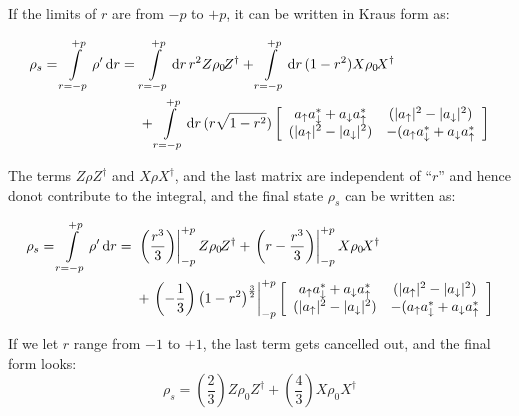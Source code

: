 \documentclass[english]{article}
\DeclarePairedDelimiter\abs{\lvert}{\rvert}
\begin{document}
If the limits of $r$ are from $-p$ to $+p$, it can be written in Kraus form as:

\begin{equation}\label{eq:Krausform-integral}
  \begin{aligned}
    \rho_{s} = \int\limits_{r=-p}^{+p}\rho^{\prime}\,\mathrm{d}r = {} & \int\limits_{r=-p}^{+p}\mathrm{d}r\,r^{2}Z\rho_{0}\!Z^{\dagger} + \int\limits_{r=-p}^{+p}\mathrm{d}r\,(1-r^{2})X\rho_{0}\!X^{\dagger} \\
                  & + \int\limits_{r=-p}^{+p}\mathrm{d}r\,(r\sqrt{1-r^{2}})\left[\begin{array}{cc}a_{\uparrow}a_{\downarrow}^{*}+a_{\downarrow}a_{\uparrow}^{*} & (\abs{a_{\uparrow}}^{2}-\abs{a_{\downarrow}}^{2}) \\
             (\abs{a_{\uparrow}}^{2}-\abs{a_{\downarrow}}^{2}) & -(a_{\uparrow}a_{\downarrow}^{*}+a_{\downarrow}a_{\uparrow}^{*} \end{array}\right]
  \end{aligned}
\end{equation}

The terms $Z\rho\!Z^{\dagger}$ and $X\rho\!X^{\dagger}$, and the last matrix are independent of ``$r$'' and hence donot contribute to the integral, and the final state $\rho_{s}$ can be written as:

\begin{equation}
  \begin{aligned}
    \rho_{s} = \int\limits_{r=-p}^{+p}\rho^{\prime}\,\mathrm{d}r = {} & \left.\left(\dfrac{r^{3}}{3}\right)\right|_{-p}^{+p}Z\rho_{0}\!Z^{\dagger} + \left.\left(r -\dfrac{r^{3}}{3}\right)\right|_{-p}^{+p}X\rho_{0}\!X^{\dagger} \\
                  & + \left.\left(-\dfrac{1}{3}\right)\left(1-r^{2}\right)^{\frac{3}{2}}\right|_{-p}^{+p}\left[\begin{array}{cc}a_{\uparrow}a_{\downarrow}^{*}+a_{\downarrow}a_{\uparrow}^{*} & (\abs{a_{\uparrow}}^{2}-\abs{a_{\downarrow}}^{2}) \\
             (\abs{a_{\uparrow}}^{2}-\abs{a_{\downarrow}}^{2}) & -(a_{\uparrow}a_{\downarrow}^{*}+a_{\downarrow}a_{\uparrow}^{*} \end{array}\right]
    \end{aligned}
\end{equation}

If we let $r$ range from $-1$ to $+1$, the last term gets cancelled out, and the final form looks:
\begin{equation}
    \rho_{s} = \left(\dfrac{2}{3}\right)Z\rho_{0}\!Z^{\dagger} + \left(\dfrac{4}{3}\right)X\rho_{0}\!X^{\dagger}
\end{equation}
\end{document}
